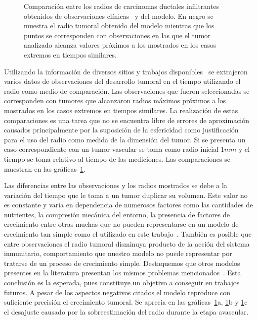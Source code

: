 \begin{figure}[p]
\begin{center}
\end{center}\vspace*{-0.6cm}
\caption[Comparaci\'on entre los radios de carcinomas ductales infiltrantes obtenidos de observaciones cl\'inicas y del modelo]{Comparaci\'on entre los radios de carcinomas ductales infiltrantes obtenidos de observaciones cl\'inicas~\cite{wisconsin,wisconsindata,kuhn,helmlinger} y del modelo. En negro se muestra el radio tumoral obtenido del modelo mientras que los puntos se corresponden con observaciones en las que el tumor analizado alcanza valores pr\'oximos a los mostrados en los casos extremos en tiempos similares.}
\label{graph-growth-validation}
\end{figure}

Utilizando la informaci\'on de diversos sitios y trabajos disponibles~\cite{wisconsin,wisconsindata,kuhn,helmlinger} se extrajeron varios datos de observaciones del desarrollo tumoral en el tiempo utilizando el radio como medio de comparaci\'on. Las observaciones que fueron seleccionadas se corresponden con tumores que alcanzaron radios m\'aximos pr\'oximos a los mostrados en los casos extremos en tiempos similares. La realizaci\'on de estas comparaciones es una tarea que no se encuentra libre de errores de aproximaci\'on causados principalmente por la suposici\'on de la esfericidad como justificaci\'on para el uso del radio como medida de la dimensi\'on del tumor. Si se presenta un caso correspondiente con un tumor vascular se toma como radio inicial $1mm$ y el tiempo se toma relativo al tiempo de las mediciones. Las comparaciones se muestran en las gr\'aficas~\ref{graph-growth-validation}. 

Las diferencias entre las observaciones y los radios mostrados se debe a la variaci\'on del tiempo que le toma a un tumor duplicar su volumen. Este valor no es constante y var\'ia en dependencia de numerosos factores como las cantidades de nutrientes, la compresi\'on mec\'anica del entorno, la presencia de factores de crecimiento entre otras muchas que no pueden representarse en un modelo de crecimiento tan simple como el utilizado en este trabajo~\cite{robins,nakashima}. Tambi\'en es posible que entre observaciones el radio tumoral disminuya producto de la acci\'on del sistema inmunitario, comportamiento que nuestro modelo no puede representar por tratarse de un proceso de crecimiento simple. Destaquemos que otros modelos presentes en la literatura presentan los mismos problemas mencionados~\cite{kansal,dormann}. Esta conclusi\'on es la esperada, pues constituye un objetivo a conseguir en trabajos futuros. A pesar de los aspectos negativos citados el modelo reproduce con suficiente precisi\'on el crecimiento tumoral. Se aprecia en las gr\'aficas~\ref{graph-growth-validation}a, \ref{graph-growth-validation}b y \ref{graph-growth-validation}c el desajuste causado por la sobreestimaci\'on del radio durante la etapa avascular.

